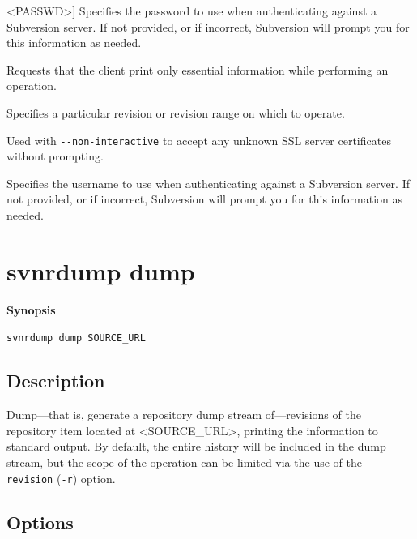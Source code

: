\begin{description}
\textless PASSWD\textgreater{}]
Specifies the password to use when authenticating against a Subversion
server. If not provided, or if incorrect, Subversion will prompt you for
this information as needed.
\item[\protect\phantomsection\label{svn.ref.svnrdump.sw.quiet}{}\texttt{-\/-quiet}
(\texttt{-q})]
Requests that the client print only essential information while
performing an operation.
\item[\protect\phantomsection\label{svn.ref.svnrdump.sw.revision}{}\texttt{-\/-revision}
(\texttt{-r}) \textless ARG\textgreater{}]
Specifies a particular revision or revision range on which to operate.
\item[\protect\phantomsection\label{svn.ref.svnrdump.sw.trust_server_cert}{}\texttt{-\/-trust-server-cert}]
Used with \texttt{-\/-non-interactive} to accept any unknown SSL server
certificates without prompting.
\item[\protect\phantomsection\label{svn.ref.svnrdump.sw.username}{}\texttt{-\/-username}
\textless NAME\textgreater{}]
Specifies the username to use when authenticating against a Subversion
server. If not provided, or if incorrect, Subversion will prompt you for
this information as needed.
\end{description}

\section{svnrdump dump}\label{svn.ref.svnrdump.c.dump}

\emph{}

\textbf{Synopsis}

\texttt{svnrdump\ dump\ SOURCE\_URL}

\subsection{Description}

Dump---that is, generate a repository dump stream of---revisions of the
repository item located at \textless SOURCE\_URL\textgreater, printing
the information to standard output. By default, the entire history will
be included in the dump stream, but the scope of the operation can be
limited via the use of the \texttt{-\/-revision} (\texttt{-r}) option.

\subsection{Options}

